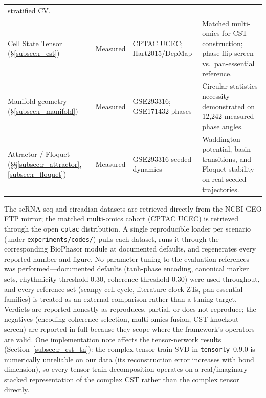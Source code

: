 \documentclass[preprint,12pt,amsmath,amssymb,superscriptaddress,floatfix]{revtex4-2}
\begin{document}
\begin{table}[t]
\begin{tabular}{p{3.4cm}p{1.5cm}p{3.6cm}p{5.6cm}}
stratified CV. \\
Cell State Tensor (\S\ref{subsec:r_cst}) & Measured & CPTAC UCEC; Hart2015/DepMap &
Matched multi-omics for CST construction; phase-flip screen vs.\ pan-essential
reference. \\
Manifold geometry (\S\ref{subsec:r_manifold}) & Measured & GSE293316;
GSE171432 phases & Circular-statistics necessity demonstrated on 12{,}242
measured phase angles. \\
Attractor / Floquet (\S\S\ref{subsec:r_attractor},\ref{subsec:r_floquet}) &
Measured & GSE293316-seeded dynamics & Waddington potential, basin transitions,
and Floquet stability on real-seeded trajectories. \\
\bottomrule
\end{tabular}
\end{table}

The scRNA-seq and circadian datasets are retrieved directly from the NCBI GEO
FTP mirror; the matched multi-omics cohort (CPTAC UCEC) is retrieved through
the open \texttt{cptac} distribution. A single reproducible loader per
scenario (under \texttt{experiments/codes/}) pulls each dataset, runs it
through the corresponding BioPhasor module at documented defaults, and
regenerates every reported number and figure. No parameter tuning to the
evaluation references was performed---documented defaults (tanh-phase encoding,
canonical marker sets, rhythmicity threshold $0.30$, coherence threshold
$0.30$) were used throughout, and every reference set (scanpy cell-cycle,
literature clock ZTs, pan-essential families) is treated as an external
comparison rather than a tuning target. Verdicts are reported honestly as
reproduces, partial, or does-not-reproduce; the negatives (encoding-coherence
selection, multi-omics fusion, CST knockout screen) are reported in full
because they scope where the framework's operators are valid. One
implementation note affects the tensor-network results
(Section~\ref{subsec:r_cst_tn}): the complex tensor-train SVD in
\texttt{tensorly}~$0.9.0$ is numerically unreliable on our data (its
reconstruction error increases with bond dimension), so every tensor-train
decomposition operates on a real/imaginary-stacked representation of the complex
CST rather than the complex tensor directly.


\end{document}
